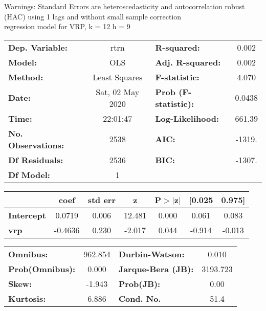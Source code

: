 Warnings: \newline
 [1] Standard Errors are heteroscedasticity and autocorrelation robust (HAC) using 1 lags and without small sample correction\\ 

regression model for VRP, k = 12 h = 9\begin{center}
\begin{tabular}{lclc}
\toprule
\textbf{Dep. Variable:}    &       rtrn       & \textbf{  R-squared:         } &     0.002   \\
\textbf{Model:}            &       OLS        & \textbf{  Adj. R-squared:    } &     0.002   \\
\textbf{Method:}           &  Least Squares   & \textbf{  F-statistic:       } &     4.070   \\
\textbf{Date:}             & Sat, 02 May 2020 & \textbf{  Prob (F-statistic):} &   0.0438    \\
\textbf{Time:}             &     22:01:47     & \textbf{  Log-Likelihood:    } &    661.39   \\
\textbf{No. Observations:} &        2538      & \textbf{  AIC:               } &    -1319.   \\
\textbf{Df Residuals:}     &        2536      & \textbf{  BIC:               } &    -1307.   \\
\textbf{Df Model:}         &           1      & \textbf{                     } &             \\
\bottomrule
\end{tabular}
\begin{tabular}{lcccccc}
                   & \textbf{coef} & \textbf{std err} & \textbf{z} & \textbf{P$> |$z$|$} & \textbf{[0.025} & \textbf{0.975]}  \\
\midrule
\textbf{Intercept} &       0.0719  &        0.006     &    12.481  &         0.000        &        0.061    &        0.083     \\
\textbf{vrp}       &      -0.4636  &        0.230     &    -2.017  &         0.044        &       -0.914    &       -0.013     \\
\bottomrule
\end{tabular}
\begin{tabular}{lclc}
\textbf{Omnibus:}       & 962.854 & \textbf{  Durbin-Watson:     } &    0.010  \\
\textbf{Prob(Omnibus):} &   0.000 & \textbf{  Jarque-Bera (JB):  } & 3193.723  \\
\textbf{Skew:}          &  -1.943 & \textbf{  Prob(JB):          } &     0.00  \\
\textbf{Kurtosis:}      &   6.886 & \textbf{  Cond. No.          } &     51.4  \\
\bottomrule
\end{tabular}
\end{center}


